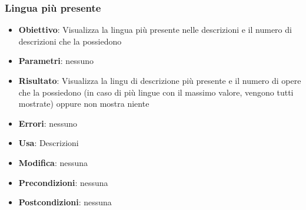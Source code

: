 \subsubsection{Lingua più presente}
\begin{itemize}
	\item \textbf{Obiettivo}: Visualizza la lingua più presente nelle descrizioni e il numero di descrizioni che la possiedono
	\item \textbf{Parametri}: nessuno
	\item \textbf{Risultato}: Visualizza la lingu di descrizione più presente e il numero di opere che la possiedono (in caso di più lingue con il massimo valore, vengono tutti mostrate) oppure non mostra niente
	\item \textbf{Errori}: nessuno
	\item \textbf{Usa}: Descrizioni
	\item \textbf{Modifica}: nessuna
	\item \textbf{Precondizioni}: nessuna
	\item \textbf{Postcondizioni}: nessuna
\end{itemize}
